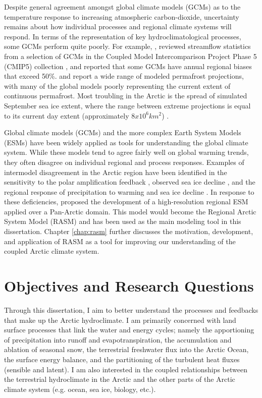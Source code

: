 Despite general agreement amongst global climate models (GCMs) as to the temperature response to increasing atmospheric carbon-dioxide, uncertainty remains about how individual processes and regional climate systems will respond.
In terms of the representation of key hydroclimatological processes, some GCMs perform quite poorly.
For example, \citet{Alkama_2013}, reviewed streamflow statistics from a selection of GCMs in the Coupled Model Intercomparison Project Phase 5 (CMIP5) collection \citet{Taylor_2012}, and reported that some GCMs have annual regional biases that exceed 50\%.
\citet{Slater_2013} and \citet{Koven_2013} report a wide range of modeled permafrost projections, with many of the global models poorly representing the current extent of continuous permafrost.
Most troubling in the Arctic is the spread of simulated September sea ice extent, where the range between extreme projections is equal to its current day extent (approximately $8x10^6 km^2$) \citep[e.g.][]{Maslowski_2012}.

Global climate models (GCMs) and the more complex Earth System Models (ESMs) have been widely applied as tools for understanding the global climate system.
While these models tend to agree fairly well on global warming trends, they often disagree on individual regional and process responses.
Examples of intermodel disagreement in the Arctic region have been identified in the sensitivity to the polar amplification feedback \citep{Serreze_2006b,Holland_2003}, observed sea ice decline \citep{Stroeve_2007,Zhang_2010}, and the regional response of precipitation to warming and sea ice decline \citep{Bintanja_2014}.
In response to these deficiencies, \citet{Roberts_2010} proposed the development of a high-resolution regional ESM applied over a Pan-Arctic domain.
This model would become the Regional Arctic System Model (RASM) and has been used as the main modeling tool in this dissertation.
Chapter \ref{chap:rasm} further discusses the motivation, development, and application of RASM as a tool for improving our understanding of the coupled Arctic climate system.

\section{Objectives and Research Questions}

Through this dissertation, I aim to better understand the processes and feedbacks that make up the Arctic hydroclimate.
I am primarily concerned with land surface processes that link the water and energy cycles; namely the apportioning of precipitation into runoff and evapotranspiration, the accumulation and ablation of seasonal snow, the terrestrial freshwater flux into the Arctic Ocean, the surface energy balance, and the partitioning of the turbulent heat fluxes (sensible and latent).
I am also interested in the coupled relationships between the terrestrial hydroclimate in the Arctic and the other parts of the Arctic climate system (e.g. ocean, sea ice, biology, etc.).

